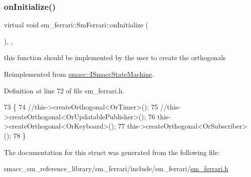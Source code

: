 \subsubsection{\texorpdfstring{on\+Initialize()}{onInitialize()}}
{\footnotesize\ttfamily virtual void sm\+\_\+ferrari\+::\+Sm\+Ferrari\+::on\+Initialize (\begin{DoxyParamCaption}{ }\end{DoxyParamCaption})\hspace{0.3cm}{\ttfamily [inline]}, {\ttfamily [override]}, {\ttfamily [virtual]}}



this function should be implemented by the user to create the orthogonals 



Reimplemented from \hyperlink{classsmacc_1_1ISmaccStateMachine_ac2982c6c8283663e5e1e8a7c82f511ec}{smacc\+::\+I\+Smacc\+State\+Machine}.



Definition at line 72 of file sm\+\_\+ferrari.\+h.


\begin{DoxyCode}
73     \{
74         \textcolor{comment}{//this->createOrthogonal<OrTimer>();}
75         \textcolor{comment}{//this->createOrthogonal<OrUpdatablePublisher>();}
76         this->createOrthogonal<OrKeyboard>();
77         this->createOrthogonal<OrSubscriber>();
78     \}
\end{DoxyCode}


The documentation for this struct was generated from the following file\+:\begin{DoxyCompactItemize}
\item 
smacc\+\_\+sm\+\_\+reference\+\_\+library/sm\+\_\+ferrari/include/sm\+\_\+ferrari/\hyperlink{sm__ferrari_8h}{sm\+\_\+ferrari.\+h}\end{DoxyCompactItemize}
